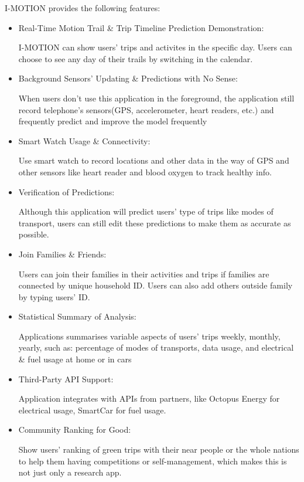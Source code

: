 \documentclass[12pt,two side]{report}
\begin{document}
I-MOTION provides the following features:
\begin{itemize}
  \item Real-Time Motion Trail \& Trip Timeline Prediction Demonstration: 
  
  I-MOTION can show users' trips and activites in the specific day. Users can choose to see any day of their trails by switching in the calendar.
  
  \item Background Sensors' Updating \& Predictions with No Sense:

  When users don't use this application in the foreground, the application still record telephone's sensors(GPS, accelerometer, heart readers, etc.) and frequently predict and improve the model frequently
  
  \item Smart Watch Usage \& Connectivity:

  Use smart watch to record locations and other data in the way of GPS and other sensors like heart reader and blood oxygen to track healthy info.
  
  \item Verification of Predictions:

  Although this application will predict users' type of trips like modes of transport, users can still edit these predictions to make them as accurate as possible.
  
  \item Join Families \& Friends:

  Users can join their families in their activities and trips if families are connected by unique household ID. Users can also add others outside family by typing users' ID.

  \item Statistical Summary of Analysis:
  
  Applications summarises variable aspects of users' trips weekly, monthly, yearly, such as: percentage of modes of transports, data usage, and electrical \& fuel usage at home or in cars

  \item Third-Party API Support:

  Application integrates with APIs from partners, like Octopus Energy for electrical usage, SmartCar for fuel usage.

  \item Community Ranking for Good:

    Show users' ranking of green trips with their near people or the whole nations to help them having competitions or self-management, which makes this is not just only a research app.
  
\end{itemize}
\end{document}
